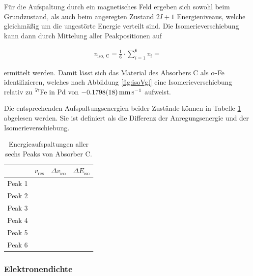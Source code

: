 \documentclass[
a4paper,                %
titlepage=firstiscover, %
captions=tableheading,  %
toc=bibliography,       %
toc=listof,             %
oneside,                %
automark,               %
12pt,                   %
english, ngerman,       %
parskip = half,         %
]{scrartcl}
\begin{document}
\noindent Für die Aufspaltung durch ein magnetisches Feld ergeben sich sowohl beim Grundzustand, als auch beim angeregten Zustand $2I + 1$ Energieniveaus, welche gleichmäßig um die ungestörte Energie verteilt sind.
Die Isomerieverschiebung kann dann durch Mittelung aller Peakpositionen auf

\begin{align*}
v_\text{iso, C} = \frac{1}{6}\cdot\sum_{i=1}^6 v_i = 
\end{align*}

\noindent ermittelt werden.
Damit lässt sich das Material des Absorbers C als $\alpha$-Fe identifizieren, welches nach Abbildung \ref{fig:isoVgl} eine Isomerieverschiebung relativ zu $^{57}$Fe in Pd von $\SI{-0.1798 \pm 0.0018}{\milli\meter\per\second}$ aufweist.

Die entsprechenden Aufspaltungsenergien beider Zustände können in Tabelle \ref{tab:isoC} abgelesen werden.
Sie ist definiert als die Differenz der Anregungsenergie und der Isomerieverschiebung.

\begin{table}[H]
	\centering
	\caption{Energieaufspaltungen aller sechs Peaks von Absorber C.} 
	\label{tab:isoC}
	\begin{tabular}{c|ccc}
		\toprule
		&       $v_\text{res}$         &     $\Delta v_\text{iso}$      &     $\Delta E_\text{iso}$     \\ \midrule
		Peak 1 &  &  &   \\
		Peak 2 &  &  &   \\
		Peak 3 &  &  &   \\
		Peak 4 &  &  &   \\
		Peak 5 &  &  &   \\
		Peak 6 &  &  &   \\ \bottomrule
	\end{tabular}
\end{table} 


\subsubsection{Elektronendichte}
\end{document}
